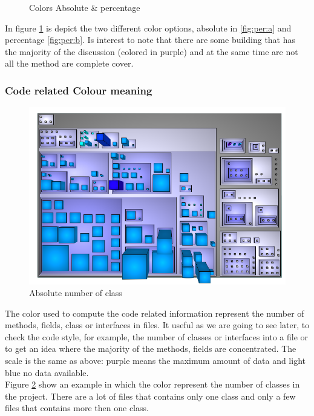 \documentclass[]{usiinfbachelorproject}
\begin{document}
\begin{figure}[h]
\centering
{}
\hspace*{\fill}

\caption{Colors Absolute \& percentage}
\label{fig:per}
\end{figure}
In figure \ref{fig:per} is depict the two different color options, absolute in \ref{fig:per:a} and percentage \ref{fig:per:b}.
Is interest to note that there are some building that has the majority of the discussion (colored in purple) and at the same time are not all the method are complete cover. 
\newpage

\subsubsection{Code related Colour meaning}
\begin{figure}
\centering
\includegraphics[width=.30\textwidth]{images/classAbs}
\caption{Absolute number of class \label{fig:classAbs}
}
\end{figure}

The color used to compute the code related information represent  the number of methods, fields, class or interfaces in files. It useful as we are going to see later, to check the code style, for example, the number of classes or interfaces into a file or to get an idea where the majority of the methods, fields are concentrated. The scale is the same as above: purple means the maximum amount of  data and light blue no data available. \\
Figure \ref{fig:classAbs} show an example in which the color represent the number of classes in the project. There are a lot of files that contains only one class and only a few files that  contains more then one class. 
	
\end{document}
